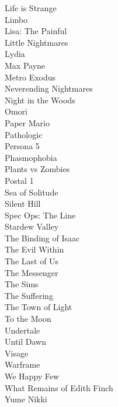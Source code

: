 \documentclass[12pt, a4paper,twoside,titlepage]{book}
\begin{document}
\begin{enumerate}[label=\textbf{\arabic*}.]
    Life is Strange\\
    Limbo\\
    Lisa: The Painful\\
    Little Nightmares\\
    Lydia\\
    Max Payne\\
    Metro Exodus\\
    Neverending Nightmares\\
    Night in the Woods\\
    Omori\\
    Paper Mario\\
    Pathologic\\
    Persona 5\\
    Phasmophobia\\
    Plants vs Zombies\\
    Postal 1\\
    Sea of Solitude\\
    Silent Hill\\
    Spec Ops: The Line\\
    Stardew Valley\\ 
    The Binding of Isaac \\
    The Evil Within\\
    The Last of Us\\
    The Messenger\\
    The Sims\\
    The Suffering\\
    The Town of Light\\
    To the Moon\\
    Undertale\\
    Until Dawn\\
    Visage\\
    Warframe \\
    We Happy Few\\
    What Remains of Edith Finch\\
    Yume Nikki\\


\end{enumerate}
\end{document}
